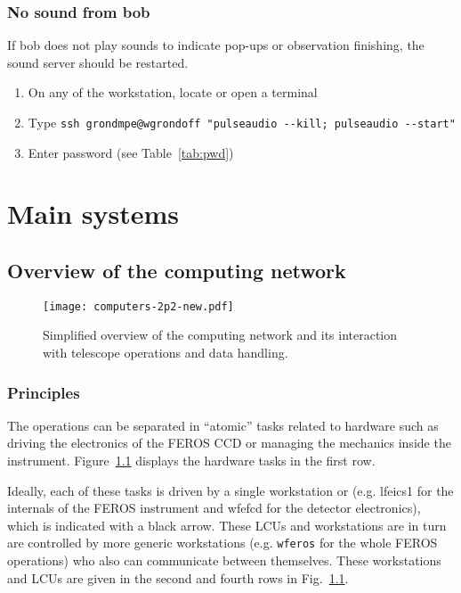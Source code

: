 \documentclass[11pt,fleqn,a4paper]{book}
\begin{document}
\subsection{No sound from bob}

If \gls{bob} does not play sounds to indicate pop-ups or observation finishing, the sound server should be restarted.

\begin{enumerate}
    \item On any of the workstation, locate or open a terminal
    \item Type \texttt{ssh grondmpe@wgrondoff "pulseaudio {-}{-}kill; pulseaudio {-}{-}start"}
    \item Enter password (see Table~\ref{tab:pwd})
\end{enumerate}



\chapter{Main systems}
\label{chap:compo}

\section{Overview of the computing network}
\begin{figure}[p]
\centering
\texttt{[image: computers-2p2-new.pdf]}
\caption[Overview of the computing network]{Simplified overview of the computing network and its interaction with telescope operations and data handling.}
\label{fig:network}
\end{figure}

\subsection{Principles}
The operations can be separated in ``atomic'' tasks related to hardware such as driving the electronics of the FEROS CCD or managing the mechanics inside the instrument. Figure~\ref{fig:network} displays the hardware tasks in the first row.

Ideally, each of these tasks is driven by a single \gls{workstation} or  (e.g. \gls{lfeics1} for the internals of the FEROS instrument and \gls{wfefcd} for the detector electronics), which is indicated with a black arrow.  These LCUs and workstations are in turn are controlled by more generic workstations (e.g. \texttt{wferos} for the whole FEROS operations) who also can communicate between themselves. These workstations and LCUs are given in the second and fourth rows in Fig.~\ref{fig:network}.  
\end{document}
